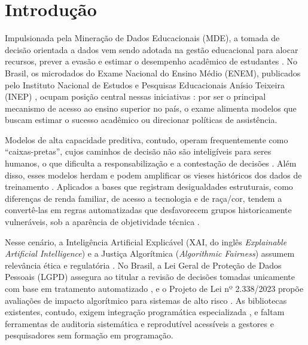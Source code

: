 \section{Introdução}
\label{sec:introducao}

Impulsionada pela Mineração de Dados Educacionais (MDE), a tomada de decisão orientada a dados vem sendo adotada na gestão educacional para alocar recursos, prever a evasão e estimar o desempenho acadêmico de estudantes \cite{romero2010educational}. No Brasil, os microdados do Exame Nacional do Ensino Médio (ENEM), publicados pelo Instituto Nacional de Estudos e Pesquisas Educacionais Anísio Teixeira (INEP) \cite{inep2022microdados}, ocupam posição central nessas iniciativas \cite{luz2025uso, souza2025desigualdades}: por ser o principal mecanismo de acesso ao ensino superior no país, o exame alimenta modelos que buscam estimar o sucesso acadêmico ou direcionar políticas de assistência.

Modelos de alta capacidade preditiva, contudo, operam frequentemente como ``caixas-pretas'', cujos caminhos de decisão não são inteligíveis para seres humanos, o que dificulta a responsabilização e a contestação de decisões \cite{adadi2018peeking, rudin2019stop}. Além disso, esses modelos herdam e podem amplificar os vieses históricos dos dados de treinamento \cite{barocas2023fairness}. Aplicados a bases que registram desigualdades estruturais, como diferenças de renda familiar, de acesso a tecnologia e de raça/cor, tendem a convertê-las em regras automatizadas que desfavorecem grupos historicamente vulneráveis, sob a aparência de objetividade técnica \cite{baker2022algorithmic}.

Nesse cenário, a Inteligência Artificial Explicável (XAI, do inglês \textit{Explainable Artificial Intelligence}) e a Justiça Algorítmica (\textit{Algorithmic Fairness}) assumem relevância ética e regulatória \cite{arrieta2020explainable, barocas2023fairness}. No Brasil, a Lei Geral de Proteção de Dados Pessoais (LGPD) assegura ao titular a revisão de decisões tomadas unicamente com base em tratamento automatizado \cite{brasil2018lgpd}, e o Projeto de Lei nº 2.338/2023 propõe avaliações de impacto algorítmico para sistemas de alto risco \cite{brasil2023pl2338}. As bibliotecas existentes, contudo, exigem integração programática especializada \cite{bird2020fairlearn, bellamy2018aif360}, e faltam ferramentas de auditoria sistemática e reprodutível acessíveis a gestores e pesquisadores sem formação em programação.

